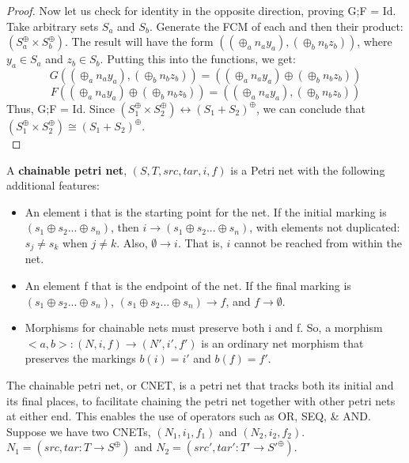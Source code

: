 \begin{lemma}
\begin{proof}
Now let us check for identity in the opposite direction, proving G;F = Id.\\
Take arbitrary sets $S_a$ and $S_b$. Generate the FCM of each and then their product: $(S_a^\oplus \times S_b^\oplus)$. The result will have the form $((\oplus_a n_a y_a), (\oplus_b n_b z_b))$, where $y_a \in S_a$ and $z_b \in S_b$. Putting this into the functions, we get:\\ 
\[G((\oplus_a n_a y_a), (\oplus_b n_b z_b)) = ((\oplus_a n_a y_a) \oplus (\oplus_b n_b z_b))\] 
\[F((\oplus_a n_a y_a) \oplus (\oplus_b n_b z_b)) = ((\oplus_a n_a y_a), (\oplus_b n_b z_b))\]
Thus, G;F = Id. 
Since $(S_1 ^\oplus \times S_2 ^\oplus) \leftrightarrow (S_1 + S_2)^\oplus$, we can conclude that $(S_1 ^\oplus \times S_2 ^\oplus) \cong (S_1 + S_2)^\oplus$.\\
\end{proof}
%
\end{lemma}
%
\begin{definition}
  \label{Chainable-Petri-Net}
  A \textbf{chainable petri net}, $(S, T, src, tar, i, f)$ is a Petri net with the following additional features: 
  \begin{itemize}
  \item An element i that is the starting point for the net. If the initial marking is $(s_1 \oplus s_2 ... \oplus s_n)$, then $i \to (s_1 \oplus s_2 ... \oplus s_n)$, with elements not duplicated: $s_j \neq s_k$ when $j \neq k$. Also, $\emptyset \to i$. That is, $i$ cannot be reached from within the net. 
  \item An element f that is the endpoint of the net. If the final marking is $(s_1 \oplus s_2 ... \oplus s_n)$, $(s_1 \oplus s_2 ... \oplus s_n) \to f$, and $f \to \emptyset$. 
   \item Morphisms for chainable nets must preserve both i and f. So, a morphism $<a,b>: (N, i, f) \to (N', i', f')$ is an ordinary net morphism that preserves the markings $b(i) = i'$ and $b(f) = f'$. 
 \end{itemize}
\end{definition}
The chainable petri net, or CNET, is a petri net that tracks both its initial and its final places, to facilitate chaining the petri net together with other petri nets at either end. This enables the use of operators such as OR, SEQ, \& AND.\\
Suppose we have two CNETs, $(N_1, i_1, f_1)$ and $(N_2, i_2, f_2)$. \\
$N_1 = (src, tar: T \to S^\oplus)$ and $N_2 = (src', tar': T' \to S'^\oplus)$.\bigskip\\
